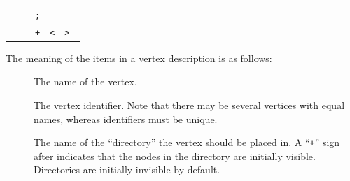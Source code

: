 \begin{isabellebody}
\begin{isamarkuptext}
  \begin{center}\small
  \begin{tabular}{rcl}
    \isa{graph} & \isa{{\isaliteral{22}{\isachardoublequote}}{\isaliteral{3D}{\isacharequal}}{\isaliteral{22}{\isachardoublequote}}} & \isa{{\isaliteral{22}{\isachardoublequote}}{\isaliteral{7B}{\isacharbraceleft}}\ vertex{\isaliteral{22}{\isachardoublequote}}}~\verb|;|~\isa{{\isaliteral{22}{\isachardoublequote}}{\isaliteral{7D}{\isacharbraceright}}{\isaliteral{2B}{\isacharplus}}{\isaliteral{22}{\isachardoublequote}}} \\
    \isa{vertex} & \isa{{\isaliteral{22}{\isachardoublequote}}{\isaliteral{3D}{\isacharequal}}{\isaliteral{22}{\isachardoublequote}}} & \isa{{\isaliteral{22}{\isachardoublequote}}vertex{\isaliteral{5F}{\isacharunderscore}}name\ vertex{\isaliteral{5F}{\isacharunderscore}}ID\ dir{\isaliteral{5F}{\isacharunderscore}}name\ {\isaliteral{5B}{\isacharbrackleft}}{\isaliteral{22}{\isachardoublequote}}}~\verb|+|~\isa{{\isaliteral{22}{\isachardoublequote}}{\isaliteral{5D}{\isacharbrackright}}\ path\ {\isaliteral{5B}{\isacharbrackleft}}{\isaliteral{22}{\isachardoublequote}}}~\verb|<|~\isa{{\isaliteral{22}{\isachardoublequote}}{\isaliteral{7C}{\isacharbar}}{\isaliteral{22}{\isachardoublequote}}}~\verb|>|~\isa{{\isaliteral{22}{\isachardoublequote}}{\isaliteral{5D}{\isacharbrackright}}\ {\isaliteral{7B}{\isacharbraceleft}}\ vertex{\isaliteral{5F}{\isacharunderscore}}ID\ {\isaliteral{7D}{\isacharbraceright}}{\isaliteral{2A}{\isacharasterisk}}{\isaliteral{22}{\isachardoublequote}}}
  \end{tabular}
  \end{center}

  The meaning of the items in a vertex description is as follows:

  \begin{description}

  \item[] The name of the vertex.

  \item[] The vertex identifier. Note that there may
  be several vertices with equal names, whereas identifiers must be
  unique.

  \item[] The name of the ``directory'' the vertex
  should be placed in.  A ``\verb|+|'' sign after  indicates that the nodes in the directory are initially
  visible. Directories are initially invisible by default.


\end{description}
\end{isamarkuptext}
\end{isabellebody}
